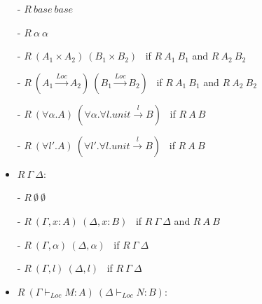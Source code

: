 \documentclass[a4paper]{article}
\theoremstyle{plain}
\theoremstyle{definition}
\newcommand{\funL}[1]{\xrightarrow{#1}}
\newcommand{\typing}[4]{#1\vdash_{#2} #3 : #4}
\newcommand{\Loc}{Loc}
\newcommand{\logicalRelText}{R}
\newcommand{\logicalRel}[2]{\logicalRelText \ #1 \ #2}
\newcommand{\logicalRelJudg}[2]{\logicalRelText \ (#1) \ (#2)}
\begin{document}
\begin{itemize}
\item[-]
$\logicalRel{base}{base}$

\item[-]
$\logicalRel{\alpha}{\alpha}$

\item[-]
$\logicalRel{(A_1\times A_2)}{(B_1\times B_2)}$ \
if
$\logicalRel{A_1}{B_1}$ and $\logicalRel{A_2}{B_2}$

\item[-]
$\logicalRel{(A_1\funL{\Loc} A_2)}{(B_1\funL{\Loc} B_2)}$ \
if
$\logicalRel{A_1}{B_1}$ and $\logicalRel{A_2}{B_2}$

\item[-]
$\logicalRel{(\forall\alpha.A)}{(\forall\alpha.\forall l. unit \funL{l}B)}$ \
if
$\logicalRel{A}{B}$

\item[-]
$\logicalRel{(\forall l'.A)}{(\forall l'.\forall l. unit \funL{l}B)}$ \
if
$\logicalRel{A}{B}$
\end{itemize}

\begin{itemize}
\item $\logicalRel{\Gamma}{\Delta}$:
\end{itemize}

\begin{itemize}
\item[-] $\logicalRel{\emptyset}{\emptyset}$

\item[-] 
$\logicalRel{(\Gamma,x:A)}{(\Delta,x:B)}$ \
if
$\logicalRel{\Gamma}{\Delta}$ and $\logicalRel{A}{B}$

\item[-] 
$\logicalRel{(\Gamma,\alpha)}{(\Delta,\alpha)}$ \ 
if
$\logicalRel{\Gamma}{\Delta}$

\item[-] 
$\logicalRel{(\Gamma,l)}{(\Delta,l)}$ \ 
if
$\logicalRel{\Gamma}{\Delta}$
\end{itemize}

\begin{itemize}
\item
$\logicalRelJudg
 {\typing{\Gamma}{\Loc}{M}{A}}
 {\typing{\Delta}{\Loc}{N}{B}}$:
\end{itemize}
\end{document}
